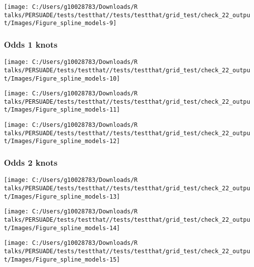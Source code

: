 \documentclass[
]{article}
\begin{document}
\begin{flushleft}\texttt{[image: C:/Users/g10028783/Downloads/R talks/PERSUADE/tests/testthat//tests/testthat/grid\_test/check\_22\_output/Images/Figure\_spline\_models-9]} \end{flushleft}

\clearpage

\subsubsection{Odds 1 knots}\label{odds-1-knots}

\begin{flushleft}\texttt{[image: C:/Users/g10028783/Downloads/R talks/PERSUADE/tests/testthat//tests/testthat/grid\_test/check\_22\_output/Images/Figure\_spline\_models-10]} \end{flushleft}

\begin{flushleft}\texttt{[image: C:/Users/g10028783/Downloads/R talks/PERSUADE/tests/testthat//tests/testthat/grid\_test/check\_22\_output/Images/Figure\_spline\_models-11]} \end{flushleft}

\begin{flushleft}\texttt{[image: C:/Users/g10028783/Downloads/R talks/PERSUADE/tests/testthat//tests/testthat/grid\_test/check\_22\_output/Images/Figure\_spline\_models-12]} \end{flushleft}

\clearpage

\subsubsection{Odds 2 knots}\label{odds-2-knots}

\begin{flushleft}\texttt{[image: C:/Users/g10028783/Downloads/R talks/PERSUADE/tests/testthat//tests/testthat/grid\_test/check\_22\_output/Images/Figure\_spline\_models-13]} \end{flushleft}

\begin{flushleft}\texttt{[image: C:/Users/g10028783/Downloads/R talks/PERSUADE/tests/testthat//tests/testthat/grid\_test/check\_22\_output/Images/Figure\_spline\_models-14]} \end{flushleft}

\begin{flushleft}\texttt{[image: C:/Users/g10028783/Downloads/R talks/PERSUADE/tests/testthat//tests/testthat/grid\_test/check\_22\_output/Images/Figure\_spline\_models-15]} \end{flushleft}
\end{document}

